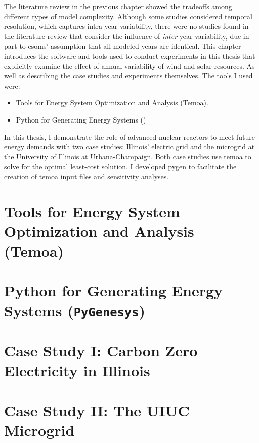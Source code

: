 The literature review in the previous chapter showed the tradeoffs among
different types of model complexity. Although some studies considered temporal
resolution, which captures intra-year variability, there were no studies found in
the literature review that consider the influence of \textit{inter}-year variability,
due in part to \glspl{esom}' assumption that all modeled years are identical.
This chapter introduces the software and tools used to conduct experiments in this
thesis that explicitly examine the effect of annual variability of wind and solar
resources. As well as describing the case studies and experiments themselves.
The tools I used were:
\begin{itemize}
  \item Tools for Energy System Optimization and Analysis (Temoa).
  \item Python for Generating Energy Systems (\pygen)
\end{itemize}
In this thesis, I demonstrate the role of advanced nuclear reactors to meet future
energy demands with two case studies: Illinois’ electric grid and the microgrid
at the University of Illinois at Urbana-Champaign. Both case studies use \gls{temoa}
to solve for the optimal least-cost solution. I developed \gls{pygen} to
facilitate the creation of \gls{temoa} input files and sensitivity analyses.

\section{Tools for Energy System Optimization and Analysis (Temoa)}


\section{Python for Generating Energy Systems (\texttt{PyGenesys})}



\section{Case Study I: Carbon Zero Electricity in Illinois}
\label{section:ilmodel}


\section{Case Study II: The UIUC Microgrid}
\label{section:uiucmodel}


